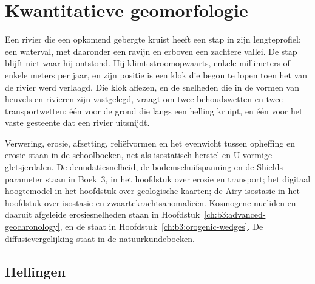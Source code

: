 \chapter{Kwantitatieve geomorfologie}\label{ch:b3:quantitative-geomorphology}

Een rivier die een opkomend gebergte kruist heeft een stap in zijn lengteprofiel: een waterval,
met daaronder een ravijn en erboven een zachtere vallei. De stap blijft niet
waar hij ontstond. Hij klimt stroomopwaarts, enkele millimeters of enkele meters per
jaar, en zijn positie is een klok die begon te lopen toen het  van de rivier
werd verlaagd. Die klok aflezen, en de snelheden die in de vormen van heuvels en rivieren zijn vastgelegd,
vraagt om twee behoudswetten en twee transportwetten: één voor de grond die langs een helling kruipt,
en één voor het vaste gesteente dat een rivier uitsnijdt.

\begin{recall}
Verwering, erosie, afzetting, reliëfvormen en het evenwicht tussen opheffing
en erosie staan in de schoolboeken, net als isostatisch herstel en U-vormige
gletsjerdalen. De denudatiesnelheid, de bodemschuifspanning en de
Shields-parameter staan in Boek~3, in het hoofdstuk over erosie en transport;
het digitaal hoogtemodel in het hoofdstuk over geologische kaarten; de
Airy-isostasie in het hoofdstuk over isostasie en zwaartekrachtsanomalieën. Kosmogene
nucliden en daaruit afgeleide erosiesnelheden staan in
Hoofdstuk~\ref{ch:b3:advanced-geochronology},  en de
 staat in Hoofdstuk~\ref{ch:b3:orogenic-wedges}. De
diffusievergelijking staat in de natuurkundeboeken.
\end{recall}

\section{Hellingen}\label{sec:b3:quantitative-geomorphology:hillslopes}

